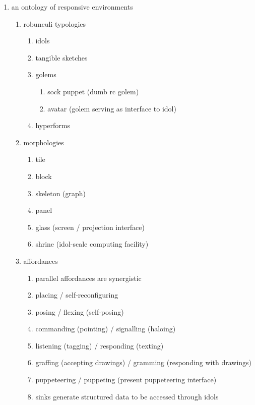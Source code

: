 \documentclass[12pt,letterpaper,notitlepage,onecolumn]{article}
\begin{document}
\begin{enumerate}
    \item an ontology of responsive environments
    \begin{enumerate}
        \item robunculi typologies
        \begin{enumerate}
            \item idols
            \item tangible sketches
            \item golems
            \begin{enumerate}
                \item sock puppet (dumb rc golem)
                \item avatar (golem serving as interface to idol)
            \end{enumerate}
            \item hyperforms
        \end{enumerate}
        \item morphologies
        \begin{enumerate}
            \item tile
            \item block
            \item skeleton (graph)
            \item panel
            \item glass (screen / projection interface)
            \item shrine (idol-scale computing facility)
        \end{enumerate}
        \item affordances
        \begin{enumerate}
            \item parallel affordances are synergistic
            \item placing / self-reconfiguring
            \item posing / flexing (self-posing)
            \item commanding (pointing) / signalling (haloing)
            \item listening (tagging) / responding (texting)
            \item graffing (accepting drawings) / gramming (responding with drawings)
            \item puppeteering / puppeting (present puppeteering interface)
            \item sinks generate structured data to be accessed through idols

\end{enumerate}
\end{enumerate}
\end{enumerate}
\end{document}
